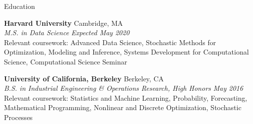 \documentclass{resume} %
\begin{document}

\begin{rSection}{Education}

{\bf Harvard University} \hfill { Cambridge, MA}
\\ {\em M.S. in Data Science} \hfill {\em Expected May 2020}
\\ Relevant coursework: Advanced Data Science, Stochastic Methods for Optimization, Modeling and Inference, Systems Development for Computational Science, Computational Science Seminar

{\bf University of California, Berkeley} \hfill {Berkeley, CA}
\\ {\em B.S. in Industrial Engineering \& Operations Research, High Honors} \hfill {\em May 2016}
\\ Relevant coursework: Statistics and Machine Learning, Probability, Forecasting, Mathematical Programming, Nonlinear and Discrete Optimization, Stochastic Processes


\end{rSection}

\end{document}
